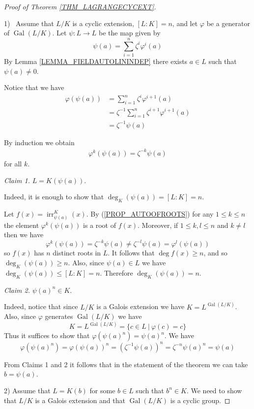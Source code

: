 \documentclass[12pt, letterpaper, oneside]{article}
\theoremstyle{plain}
\theoremstyle{definition}
\newcommand{\irr}{\operatorname{irr}}
\newcommand{\Gal}{\operatorname{Gal}}
\newcommand{\vs}{\vskip 5mm}
\begin{document}
\begin{proof}[Proof of Theorem \ref{THM_LAGRANGECYCEXT}] \ 

1) \  Assume that $L/K$ is a cyclic extension, $[L:K]=n$, and let 
$\varphi$ be a generator of $\Gal(L/K)$. Let $\psi\colon L \to L$ 
be the map given by 
$$\psi(a) = \sum_{i=1}^{n} \zeta^{i}\varphi^{i}(a)$$
By Lemma \ref{LEMMA_FIELDAUTOLININDEP} there exists $a\in L$ such that 
$\psi(a)\neq 0$. 

Notice that we have 
\begin{align*}
\varphi(\psi(a)) & =  \sum_{i=1}^{n}\zeta^{i}\varphi^{i+1}(a) \\
& = \zeta^{-1} \sum_{i=1}^{n}\zeta^{i+1}\varphi^{i+1}(a) \\
& = \zeta^{-1}\psi(a)
\end{align*}

By induction we obtain
\begin{align*}
\varphi^{k}(\psi(a)) = \zeta^{-k}\psi(a)
\end{align*}
for all $k$. 
\vs

\emph{Claim 1.} $L= K(\psi(a))$.

Indeed, it is enough to show that $\deg_{K}(\psi(a)) = [L:K] = n$. 

Let $f(x) = \irr^{K}_{\psi(a)}(x)$. By (\ref{PROP_AUTOOFROOTS}) 
for any  $1\leq k \leq n$ the element  $\varphi^{k}(\psi(a))$ is a root of $f(x)$. 
Moreover,  if  $1\leq k, l \leq n$ and $k\neq l$ then we have 
$$\varphi^{k}(\psi(a)) = \zeta^{-k}\psi(a) \neq \zeta^{-l}\psi(a) = \varphi^{l}(\psi(a))$$
so $f(x)$ has $n$ distinct roots in $L$. 
It follows that $\deg f(x) \geq n$, and so $\deg_{K}(\psi(a))\geq n$. Also, since
$\psi(a)\in L$ we have $\deg_{K}(\psi(a)) \leq [L:K] = n$. Therefore $\deg_{K}(\psi(a))=n$.

\vs

\emph{Claim 2.}   $\psi(a)^{n} \in K$.

Indeed, notice that since $L/K$ is a Galois extension we have $K = L^{\Gal(L/K)}$. 
Also, since $\varphi$ generates $\Gal(L/K)$ we have 
$$K = L^{\Gal(L/K)} = \{c\in L \ | \ \varphi(c) = c \}$$
Thus it suffices to show that $\varphi(\psi(a)^{n}) = \psi(a)^{n}$. 
We have
$$\varphi(\psi(a)^{n}) = \varphi(\psi(a))^{n} = (\zeta^{-1}\psi(a))^{n} = \zeta^{-n}\psi(a)^{n} = \psi(a)$$

From Claims 1 and 2 it follows that in the statement of the theorem we can take $b= \psi(a)$. 


\vs\vs

2)  Assume that $L = K(b)$ for some $b\in L$ such that $b^{n} \in K$. 
We need to show that $L/K$ is a Galois extension and that $\Gal(L/K)$ is a cyclic group. 


\end{proof}
\end{document}

